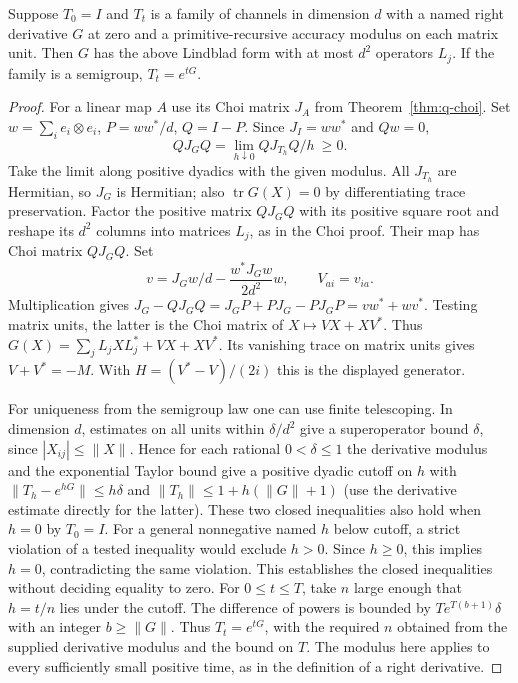 \begin{theorem}\label{thm:q-lindblad-converse}
Suppose \(T_0=I\) and \(T_t\) is a family of channels in dimension \(d\)
with a named right derivative \(G\) at zero and a primitive-recursive
accuracy modulus on each matrix unit. Then \(G\) has the above Lindblad
form with at most \(d^2\) operators \(L_j\). If the family is a semigroup,
\(T_t=e^{tG}\).
\end{theorem}
\begin{proof}
For a linear map \(A\) use its Choi matrix \(J_A\) from
Theorem~\ref{thm:q-choi}. Set \(w=\sum_i e_i\otimes e_i\),
\(P=ww^*/d\), \(Q=I-P\). Since \(J_I=ww^*\) and \(Qw=0\),
\[
       Q J_G Q=\lim_{h\downarrow0} Q J_{T_h}Q/h\ \ge0 .
\]
Take the limit along positive dyadics with the given modulus.
All \(J_{T_h}\) are Hermitian, so \(J_G\) is Hermitian; also
\(\operatorname{tr}G(X)=0\) by differentiating trace preservation.
Factor the positive matrix \(QJ_GQ\) with its positive square root
and reshape its \(d^2\) columns into matrices \(L_j\), as in the
Choi proof. Their map has Choi matrix \(QJ_GQ\).
Set
\[
             v=J_Gw/d-\frac{w^*J_Gw}{2d^2}w,
             \qquad V_{ai}=v_{ia}.
\]
Multiplication gives
\(J_G-QJ_GQ=J_GP+PJ_G-PJ_GP=vw^*+wv^*\). Testing matrix units,
the latter is the Choi matrix of \(X\mapsto VX+XV^*\).
Thus \(G(X)=\sum_j L_jXL_j^*+VX+XV^*\). Its vanishing trace on
matrix units gives \(V+V^*=-M\). With
\(H=(V^*-V)/(2i)\) this is the displayed generator.

For uniqueness from the semigroup law one can use finite telescoping.
In dimension \(d\), estimates on all units within \(\delta/d^2\)
give a superoperator bound \(\delta\), since
\(|X_{ij}|\le\|X\|\). Hence for each rational \(0<\delta\le1\) the
derivative modulus and the exponential Taylor bound give a positive
dyadic cutoff on \(h\) with
\(\|T_h-e^{hG}\|\le h\delta\) and
\(\|T_h\|\le 1+h(\|G\|+1)\) (use the derivative estimate directly for
the latter). These two closed inequalities also hold when \(h=0\)
by \(T_0=I\). For a general nonnegative named \(h\) below cutoff, a
strict violation of a tested inequality would exclude \(h>0\).
Since \(h\ge0\), this implies \(h=0\), contradicting the same violation.
This establishes the closed inequalities without deciding equality
to zero. For \(0\le t\le T\), take \(n\) large enough that \(h=t/n\)
lies under the cutoff. The difference of powers is bounded by
\(T e^{T(b+1)}\delta\) with an integer \(b\ge\|G\|\). Thus
\(T_t=e^{tG}\), with the required \(n\) obtained from the supplied
derivative modulus and the bound on \(T\). The modulus here applies to
every sufficiently small positive time, as in the definition of a
right derivative.
\end{proof}

